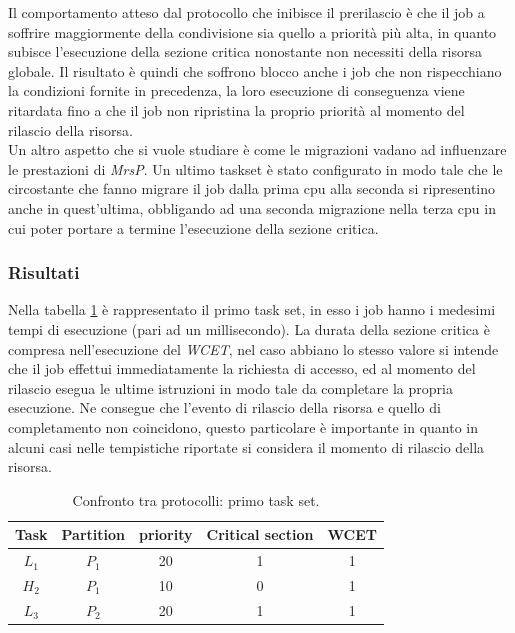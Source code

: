 \noindent Il comportamento atteso dal protocollo che inibisce il prerilascio è che il job a soffrire maggiormente della condivisione sia quello a priorità più alta, in quanto subisce l'esecuzione della sezione critica nonostante non necessiti della risorsa globale. Il risultato è quindi che soffrono blocco anche i job che non rispecchiano la condizioni fornite in precedenza, la loro esecuzione di conseguenza viene ritardata fino a che il job non ripristina la proprio priorità al momento del rilascio della risorsa.\\

\noindent Un altro aspetto che si vuole studiare è come le migrazioni vadano ad influenzare le prestazioni di \textit{MrsP}. Un ultimo taskset è stato configurato in modo tale che le circostante che fanno migrare il job dalla prima cpu alla seconda si ripresentino anche in quest'ultima, obbligando ad una seconda migrazione nella terza cpu in cui poter portare a termine l'esecuzione della sezione critica.

\subsubsection{Risultati}
\label{sec:confronto_protocolli_ris}

Nella tabella \ref{tab:test_protocols_Taskset1} è rappresentato il primo task set, in esso i job hanno i medesimi tempi di esecuzione (pari ad un millisecondo). La durata della sezione critica è compresa nell'esecuzione del \textit{WCET}, nel caso abbiano lo stesso valore si intende che il job effettui immediatamente la richiesta di accesso, ed al momento del rilascio esegua le ultime istruzioni in modo tale da completare la propria esecuzione. Ne consegue che l'evento di rilascio della risorsa e quello di completamento non coincidono, questo particolare è importante in quanto in alcuni casi nelle tempistiche riportate si considera il momento di rilascio della risorsa.\\

\begin{table}
  \centering
  \begin{tabular}{ccccc}
	\hline\hline
	    Task & Partition & priority & Critical section & WCET  \\ \hline
	    $L_1$ & $P_1$  & 20 & 1 & 1 \\
	    $H_2$ & $P_1$  & 10 & 0 & 1 \\
    	$L_3$ & $P_2$  & 20 & 1 & 1 \\
  	\hline
  	\end{tabular}
  \caption{Confronto tra protocolli: primo task set.}
  \label{tab:test_protocols_Taskset1}
\end{table}

